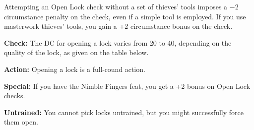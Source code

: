 Attempting an Open Lock check without a set of thieves' tools imposes a $-2$ circumstance penalty on the check, even if a simple tool is employed. If you use masterwork thieves' tools, you gain a +2 circumstance bonus on the check.

\textbf{Check:} The DC for opening a lock varies from 20 to 40, depending on the quality of the lock, as given on the table below.


\textbf{Action:} Opening a lock is a full-round action.

\textbf{Special:} If you have the Nimble Fingers feat, you get a +2 bonus on Open Lock checks.

\textbf{Untrained:} You cannot pick locks untrained, but you might successfully force them open.
